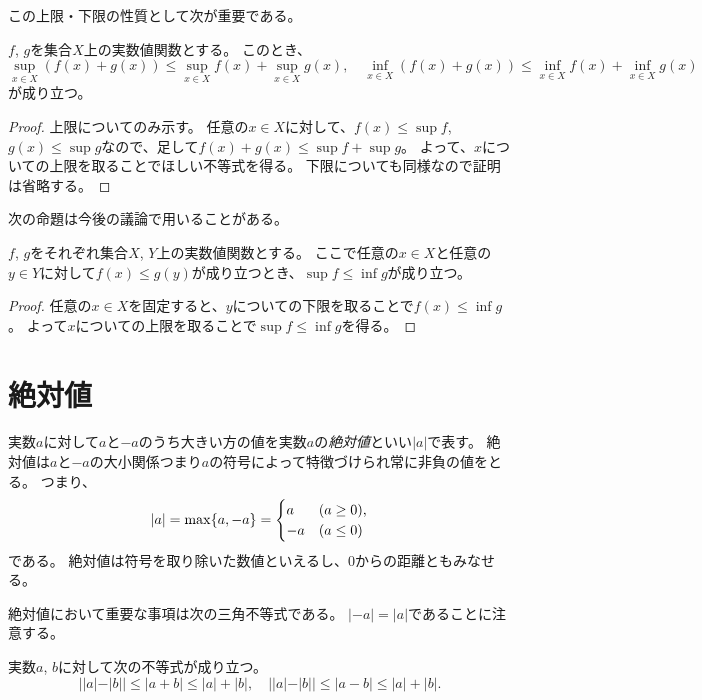 この上限・下限の性質として次が重要である。

\begin{proposition}[和と上限・下限]
$f$, $g$を集合$X$上の実数値関数とする。
このとき、
$$
\sup_{x \in X}(f(x)+g(x)) \le \sup_{x \in X}f(x)+\sup_{x \in X}g(x),
\quad \inf_{x \in X}(f(x)+g(x)) \le \inf_{x \in X}f(x)+\inf_{x \in X}g(x)
$$
が成り立つ。
\end{proposition}

\begin{proof}
上限についてのみ示す。
任意の$x \in X$に対して、$f(x) \le \sup f$, $g(x) \le \sup g$なので、足して$f(x)+g(x) \le \sup f+\sup g$。
よって、$x$についての上限を取ることでほしい不等式を得る。
下限についても同様なので証明は省略する。
\end{proof}

次の命題は今後の議論で用いることがある。

\begin{proposition}
\label{t_supinf_indep}
$f$, $g$をそれぞれ集合$X$, $Y$上の実数値関数とする。
ここで任意の$x \in X$と任意の$y \in Y$に対して$f(x) \le g(y)$が成り立つとき、$\sup f \le \inf g$が成り立つ。
\end{proposition}

\begin{proof}
任意の$x \in X$を固定すると、$y$についての下限を取ることで$f(x) \le \inf g$。
よって$x$についての上限を取ることで$\sup f \le \inf g$を得る。
\end{proof}

\section{絶対値}

実数$a$に対して$a$と$-a$のうち大きい方の値を実数$a$の\emph{絶対値}といい$|a|$で表す。
絶対値は$a$と$-a$の大小関係つまり$a$の符号によって特徴づけられ常に非負の値をとる。
つまり、
$$
|a| = \max\{ a, -a \} =
\begin{cases}
a & \text{($a \ge 0$),} \\
-a & \text{($a \le 0$)}
\end{cases}
$$
である。
絶対値は符号を取り除いた数値といえるし、$0$からの距離ともみなせる。

絶対値において重要な事項は次の三角不等式である。
$|-a| = |a|$であることに注意する。

\begin{proposition}[実数の絶対値の三角不等式]
実数$a$, $b$に対して次の不等式が成り立つ。
$$
||a|-|b|| \le |a+b| \le |a|+|b|,
\quad ||a|-|b|| \le |a-b| \le |a|+|b|.
$$
\end{proposition}

